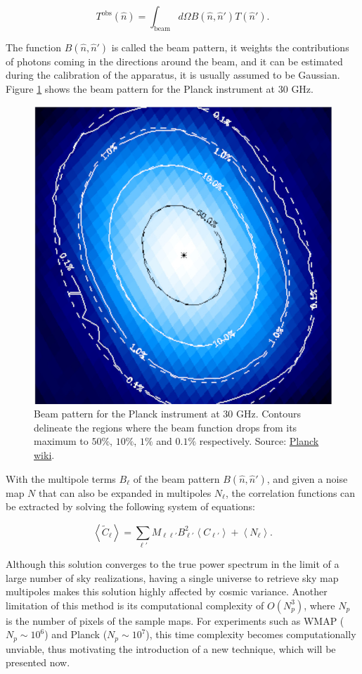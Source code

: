 \documentclass[openany,a4paper,12pt,oneside]{book}
\newcommand{\av}[1]{\left\langle #1 \right\rangle} %
\begin{document}
\begin{spacing}{1.5}
\begin{equation}\label{def:beam_pattern}
	T^\text{obs}(\hat{n})=\int_\text{beam} d\Omega B(\hat{n},\hat{n}')T(\hat{n}').
\end{equation}

The function $B(\hat{n}, \hat{n}')$ is called the beam pattern, it weights the contributions of photons coming in the directions around the beam, and it can be estimated during the calibration of the apparatus, it is usually assumed to be Gaussian. Figure \ref{fig:beam_pattern} shows the beam pattern for the Planck instrument at $30\text{ GHz}$.

\begin{figure}[!htb]
	\centering
	\includegraphics[width=.55\linewidth]{Imagens/beam_pattern.png}
	\caption{Beam pattern for the Planck instrument at $30\text{ GHz}$. Contours delineate the regions where the beam function drops from its maximum to $50\%$, $10\%$, $1\%$ and $0.1\%$ respectively. Source: \href{https://wiki.cosmos.esa.int/planckpla/index.php/Effective_Beams}{Planck wiki}.}
	\label{fig:beam_pattern}
\end{figure}

With the multipole terms $B_\ell$ of the beam pattern $B(\hat{n}, \hat{n}')$, and given a noise map $N$ that can also be expanded in multipoles $N_\ell$, the correlation functions can be extracted by solving the following system of equations:

\begin{equation}\label{ch3:av(tilde_Cl)}
    \av{\tilde{C}_\ell}=\sum_{\ell'} M_{\ell \ell'}B_{\ell'}^2\av{C_{\ell'}}+\av{N_\ell}.
\end{equation}

Although this solution converges to the true power spectrum in the limit of a large number of sky realizations, having a single universe to retrieve sky map multipoles makes this solution highly affected by cosmic variance\cite{Moura-Santos_2016}. Another limitation of this method is its computational complexity of $O(N_p^3)$, where $N_p$ is the number of pixels of the sample maps. For experiments such as WMAP ($N_p\sim 10^6$) and Planck ($N_p \sim 10^7$), this time complexity becomes computationally unviable, thus motivating the introduction of a new technique, which will be presented now.


\end{spacing}
\end{document}
